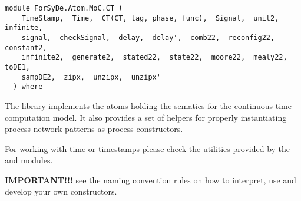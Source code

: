 \label{module:ForSyDe.Atom.MoC.CT}
\haddockbeginheader
{\haddockverb\begin{verbatim}
module ForSyDe.Atom.MoC.CT (
    TimeStamp,  Time,  CT(CT, tag, phase, func),  Signal,  unit2,  infinite, 
    signal,  checkSignal,  delay,  delay',  comb22,  reconfig22,  constant2, 
    infinite2,  generate2,  stated22,  state22,  moore22,  mealy22,  toDE1, 
    sampDE2,  zipx,  unzipx,  unzipx'
  ) where\end{verbatim}}
\haddockendheader

The  library implements the atoms holding the sematics for the
 continuous time computation model. It also provides a set of
 helpers for properly instantiating process network patterns as
 process constructors.\par
For working with time or timestamps please check the utilities
 provided by the  and
  modules.\par
\textbf{IMPORTANT!!!}
 see the \href{ForSyDe-Atom.html#naming_conv}{naming convention} rules
 on how to interpret, use and develop your own constructors.\par

